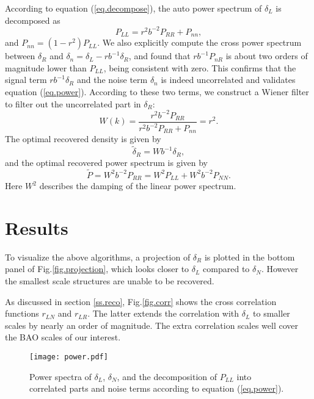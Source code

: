 \documentclass[aps,prd,twocolumn,superscriptaddress,amsfont,amssymb,amsmath,nofootinbib,showpacs,balancelastpage]{revtex4-1}
\begin{document}
According to equation (\ref{eq.decompose}), the auto power spectrum of $\delta_L$ is decomposed as
\begin{equation}\label{eq.power}
    P_{LL}=r^2b^{-2}P_{RR}+P_{nn},
\end{equation}
and $P_{nn}=(1-r^2)P_{LL}$. We also explicitly
compute the cross power spectrum between $\delta_R$ and $\delta_n=\delta_L-rb^{-1}\delta_R$,
and found that $rb^{-1}P_{nR}$ is about two orders of magnitude lower than $P_{LL}$,
being consistent with zero. This confirms that
the signal term $rb^{-1}\delta_R$ and the noise term $\delta_n$
is indeed uncorrelated and validates equation (\ref{eq.power}).
According to these two terms, we construct a Wiener filter to filter
out the uncorrelated part in $\delta_R$:
\begin{equation}
    W(k)=\frac{r^2b^{-2}P_{RR}}{r^2b^{-2}P_{RR}+P_{nn}}=r^2.
\end{equation}
The optimal recovered density is given by
\begin{equation}
    \tilde\delta_R=Wb^{-1}\delta_R,
\end{equation}
and the optimal recovered power spectrum is given by
\begin{equation}\label{eq.opt}
    \tilde P=W^2b^{-2}P_{RR}=W^2P_{LL}+W^2b^{-2}P_{NN}.
\end{equation}
Here $W^2$ describes the damping of the linear power spectrum.

\section{Results}\label{sec.results}

To visualize the above algorithms, a projection of $\delta_R$ is plotted in
the bottom panel of Fig.\ref{fig.projection}, which looks closer to
$\delta_L$ compared to $\delta_N$. However the smallest scale structures are unable
to be recovered.

As discussed in section \ref{ss.reco},
Fig.\ref{fig.corr} shows the cross correlation functions
$r_{LN}$ and $r_{LR}$. The latter extends the correlation
with $\delta_L$ to smaller scales by nearly an order of
magnitude. The extra correlation scales well cover the BAO
scales of our interest.

\begin{figure}[t] \centering
  \texttt{[image: power.pdf]}
  \caption{Power spectra of $\delta_L$, $\delta_N$, and the decomposition
  of $P_{LL}$ into correlated parts and noise terms according to equation
  (\ref{eq.power}).}
  \label{fig.recopower}
\end{figure}
\end{document}
